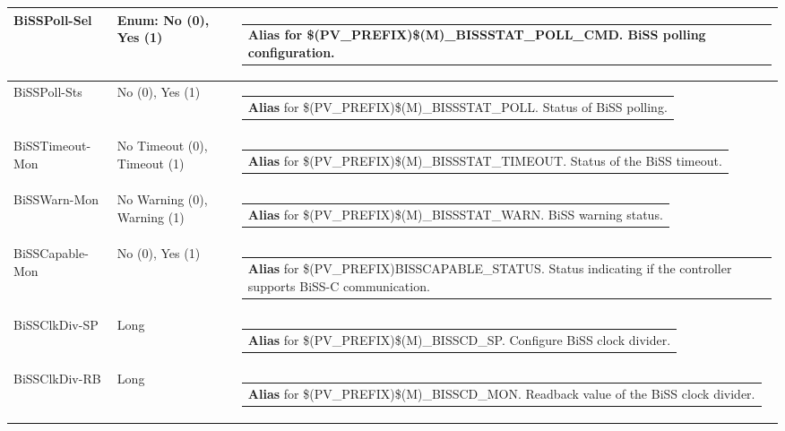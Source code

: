 \documentclass[openany]{article}
\begin{document}
\begin{longtable}{| m{4.5cm} m{2.5cm}  m{8.5cm} |}
        BiSSPoll-Sel & Enum: No (0), Yes (1) & \begin{tabular}{@{}m{6cm}@{}}
                \textbf{\color{blue} Alias} for \$(PV\_PREFIX)\$(M)\_BISSSTAT\_POLL\_CMD. BiSS polling configuration.
            \end{tabular} \hypertarget{}{}\\ \hline
        BiSSPoll-Sts & No (0), Yes (1) & \begin{tabular}{@{}m{6cm}@{}}
                \textbf{\color{blue} Alias} for \$(PV\_PREFIX)\$(M)\_BISSSTAT\_POLL. Status of BiSS polling.
            \end{tabular} \hypertarget{pv:biss-timeout-mon}{}\\ \hline
        BiSSTimeout-Mon & No Timeout (0), Timeout (1) & \begin{tabular}{@{}m{6cm}@{}}
                \textbf{\color{blue} Alias} for \$(PV\_PREFIX)\$(M)\_BISSSTAT\_TIMEOUT. Status of the BiSS timeout.
            \end{tabular} \hypertarget{pv:biss-warn-mon}{}\\ \hline
        BiSSWarn-Mon & No Warning (0), Warning (1) & \begin{tabular}{@{}m{6cm}@{}}
                \textbf{\color{blue} Alias} for \$(PV\_PREFIX)\$(M)\_BISSSTAT\_WARN. BiSS warning status.
            \end{tabular} \hypertarget{pv:biss-capable-mon}{}\\ \hline
        BiSSCapable-Mon & No (0), Yes (1) & \begin{tabular}{@{}m{6cm}@{}}
                \textbf{\color{blue} Alias} for \$(PV\_PREFIX)BISSCAPABLE\_STATUS. Status indicating if the controller supports BiSS-C communication.
            \end{tabular} \hypertarget{pv:biss-clk-div}{}\\ \hline
        BiSSClkDiv-SP & Long & \begin{tabular}{@{}m{6cm}@{}}
                \textbf{\color{blue} Alias} for \$(PV\_PREFIX)\$(M)\_BISSCD\_SP. Configure BiSS clock divider.
            \end{tabular} \hypertarget{}{}\\ \hline
        BiSSClkDiv-RB & Long & \begin{tabular}{@{}m{6cm}@{}}
                \textbf{\color{blue} Alias} for \$(PV\_PREFIX)\$(M)\_BISSCD\_MON. Readback value of the BiSS clock divider.

\end{tabular}
\end{longtable}
\end{document}
